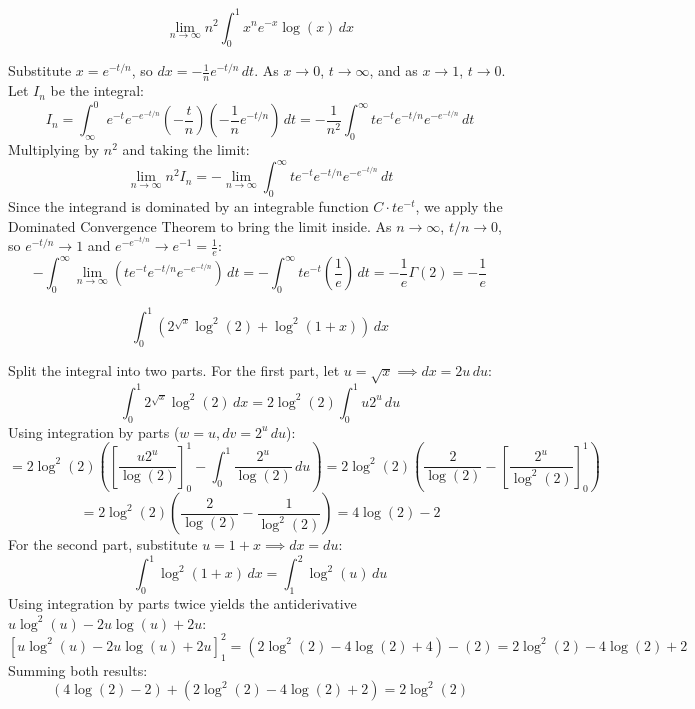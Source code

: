 \begin{questions}
    \question \[ \lim_{n \to \infty} n^2 \int_0^1 x^n e^{-x} \log(x) \,dx \]
    \begin{solution}
        Substitute $x = e^{-t/n}$, so $dx = -\frac{1}{n}e^{-t/n} \,dt$. As $x \to 0$, $t \to \infty$, and as $x \to 1$, $t \to 0$. Let $I_n$ be the integral:
        \[ I_n = \int_\infty^0 e^{-t} e^{-e^{-t/n}} \left(-\frac{t}{n}\right) \left(-\frac{1}{n}e^{-t/n}\right) \,dt = -\frac{1}{n^2} \int_0^\infty t e^{-t} e^{-t/n} e^{-e^{-t/n}} \,dt \]
        Multiplying by $n^2$ and taking the limit:
        \[ \lim_{n \to \infty} n^2 I_n = - \lim_{n \to \infty} \int_0^\infty t e^{-t} e^{-t/n} e^{-e^{-t/n}} \,dt \]
        Since the integrand is dominated by an integrable function $C \cdot t e^{-t}$, we apply the Dominated Convergence Theorem to bring the limit inside. As $n \to \infty$, $t/n \to 0$, so $e^{-t/n} \to 1$ and $e^{-e^{-t/n}} \to e^{-1} = \frac{1}{e}$:
        \[ - \int_0^\infty \lim_{n \to \infty} \left( t e^{-t} e^{-t/n} e^{-e^{-t/n}} \right) \,dt = - \int_0^\infty t e^{-t} \left(\frac{1}{e}\right) \,dt = -\frac{1}{e} \Gamma(2) = -\frac{1}{e} \]
    \end{solution}

    \question \[ \int_0^1 \left( 2^{\sqrt{x}} \log^2(2) + \log^2(1 + x) \right) \,dx \]
    \begin{solution}
        Split the integral into two parts. For the first part, let $u = \sqrt{x} \implies dx = 2u \,du$:
        \[ \int_0^1 2^{\sqrt{x}} \log^2(2) \,dx = 2\log^2(2) \int_0^1 u 2^u \,du \]
        Using integration by parts ($w=u, dv=2^u\,du$):
        \[ = 2\log^2(2) \left( \left[ \frac{u 2^u}{\log(2)} \right]_0^1 - \int_0^1 \frac{2^u}{\log(2)} \,du \right) = 2\log^2(2) \left( \frac{2}{\log(2)} - \left[ \frac{2^u}{\log^2(2)} \right]_0^1 \right) \]
        \[ = 2\log^2(2) \left( \frac{2}{\log(2)} - \frac{1}{\log^2(2)} \right) = 4\log(2) - 2 \]
        For the second part, substitute $u = 1 + x \implies dx = du$:
        \[ \int_0^1 \log^2(1 + x) \,dx = \int_1^2 \log^2(u) \,du \]
        Using integration by parts twice yields the antiderivative $u\log^2(u) - 2u\log(u) + 2u$:
        \[ \left[ u\log^2(u) - 2u\log(u) + 2u \right]_1^2 = (2\log^2(2) - 4\log(2) + 4) - (2) = 2\log^2(2) - 4\log(2) + 2 \]
        Summing both results:
        \[ (4\log(2) - 2) + (2\log^2(2) - 4\log(2) + 2) = 2\log^2(2) \]
    \end{solution}


\end{questions}
